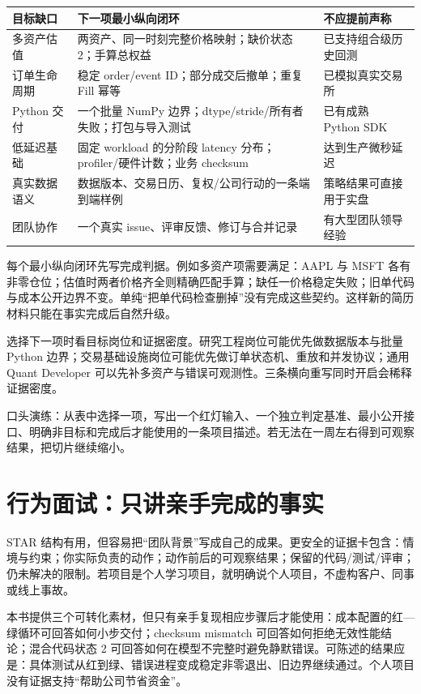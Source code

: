 \begin{center}
\begin{tabularx}{\textwidth}{@{}p{}X p{}@{}}
\toprule
目标缺口 & 下一项最小纵向闭环& 不应提前声称 \\
\midrule
多资产估值 & 两资产、同一时刻完整价格映射；缺价状态 2；手算总权益 & 已支持组合级历史回测 \\
订单生命周期 & 稳定 order/event ID；部分成交后撤单；重复 Fill 幂等 & 已模拟真实交易所 \\
Python 交付 & 一个批量 NumPy 边界；dtype/stride/所有者失败；打包与导入测试 & 已有成熟 Python SDK \\
低延迟基础 & 固定 workload 的分阶段 latency 分布；profiler/硬件计数；业务 checksum & 达到生产微秒延迟 \\
真实数据语义 & 数据版本、交易日历、复权/公司行动的一条端到端样例 & 策略结果可直接用于实盘 \\
团队协作 & 一个真实 issue、评审反馈、修订与合并记录 & 有大型团队领导经验 \\
\bottomrule
\end{tabularx}
\end{center}

每个最小纵向闭环先写完成判据。例如多资产项需要满足：AAPL 与 MSFT 各有非零仓位；估值时两者价格齐全则精确匹配手算；缺任一价格稳定失败；旧单代码与成本公开边界不变。单纯“把单代码检查删掉”没有完成这些契约。这样新的简历材料只能在事实完成后自然升级。

选择下一项时看目标岗位和证据密度。研究工程岗位可能优先做数据版本与批量 Python 边界；交易基础设施岗位可能优先做订单状态机、重放和并发协议；通用 Quant Developer 可以先补多资产与错误可观测性。三条横向重写同时开启会稀释证据密度。

口头演练：从表中选择一项，写出一个红灯输入、一个独立判定基准、最小公开接口、明确非目标和完成后才能使用的一条项目描述。若无法在一周左右得到可观察结果，把切片继续缩小。

\section{行为面试：只讲亲手完成的事实}

STAR 结构有用，但容易把“团队背景”写成自己的成果。更安全的证据卡包含：情境与约束；你实际负责的动作；动作前后的可观察结果；保留的代码/测试/评审；仍未解决的限制。若项目是个人学习项目，就明确说个人项目，不虚构客户、同事或线上事故。

本书提供三个可转化素材，但只有亲手复现相应步骤后才能使用：成本配置的红—绿循环可回答如何小步交付；checksum mismatch 可回答如何拒绝无效性能结论；混合代码状态 2 可回答如何在模型不完整时避免静默错误。可陈述的结果应是：具体测试从红到绿、错误进程变成稳定非零退出、旧边界继续通过。个人项目没有证据支持“帮助公司节省资金”。

